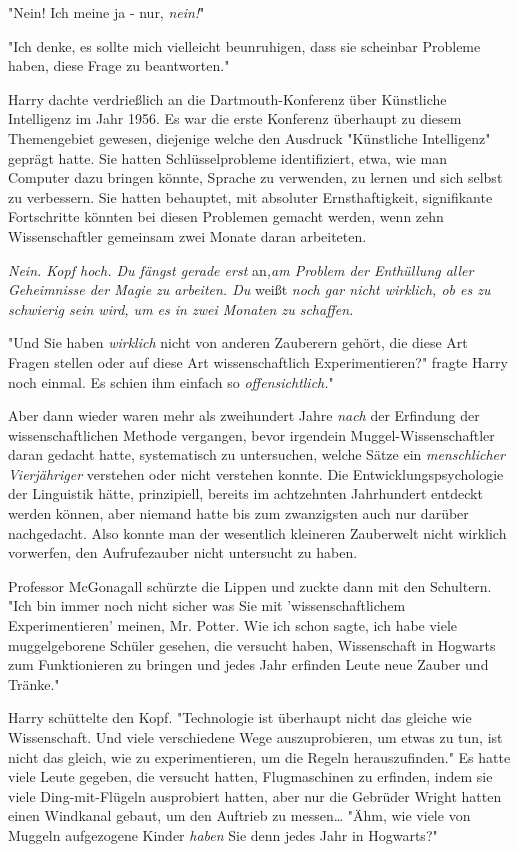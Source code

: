 {"Nein! Ich meine ja - nur, \emph{nein!}"

"Ich denke, es sollte mich vielleicht beunruhigen, dass sie scheinbar Probleme haben, diese Frage zu beantworten."

Harry dachte verdrießlich an die Dartmouth-Konferenz über Künstliche Intelligenz im Jahr 1956. Es war die erste Konferenz überhaupt zu diesem Themengebiet gewesen, diejenige welche den Ausdruck "Künstliche Intelligenz" geprägt hatte. Sie hatten Schlüsselprobleme identifiziert, etwa, wie man Computer dazu bringen könnte, Sprache zu verwenden, zu lernen und sich selbst zu verbessern. Sie hatten behauptet, mit absoluter Ernsthaftigkeit, signifikante Fortschritte könnten bei diesen Problemen gemacht werden, wenn zehn Wissenschaftler gemeinsam zwei Monate daran arbeiteten.

\emph{Nein. Kopf hoch. Du fängst gerade erst} an\emph{,am Problem der Enthüllung aller Geheimnisse der Magie zu arbeiten. Du} weißt \emph{noch gar nicht wirklich, ob es zu schwierig sein wird, um es in zwei Monaten zu schaffen.}

"Und Sie haben \emph{wirklich} nicht von anderen Zauberern gehört, die diese Art Fragen stellen oder auf diese Art wissenschaftlich Experimentieren?" fragte Harry noch einmal. Es schien ihm einfach so \emph{offensichtlich.}"

Aber dann wieder waren mehr als zweihundert Jahre \emph{nach} der Erfindung der wissenschaftlichen Methode vergangen, bevor irgendein Muggel-Wissenschaftler daran gedacht hatte, systematisch zu untersuchen, welche Sätze ein \emph{menschlicher Vierjähriger} verstehen oder nicht verstehen konnte. Die Entwicklungspsychologie der Linguistik hätte, prinzipiell, bereits im achtzehnten Jahrhundert entdeckt werden können, aber niemand hatte bis zum zwanzigsten auch nur darüber nachgedacht. Also konnte man der wesentlich kleineren Zauberwelt nicht wirklich vorwerfen, den Aufrufezauber nicht untersucht zu haben.

Professor McGonagall schürzte die Lippen und zuckte dann mit den Schultern. "Ich bin immer noch nicht sicher was Sie mit 'wissenschaftlichem Experimentieren' meinen, Mr. Potter. Wie ich schon sagte, ich habe viele muggelgeborene Schüler gesehen, die versucht haben, Wissenschaft in Hogwarts zum Funktionieren zu bringen und jedes Jahr erfinden Leute neue Zauber und Tränke."

Harry schüttelte den Kopf. "Technologie ist überhaupt nicht das gleiche wie Wissenschaft. Und viele verschiedene Wege auszuprobieren, um etwas zu tun, ist nicht das gleich, wie zu experimentieren, um die Regeln herauszufinden." Es hatte viele Leute gegeben, die versucht hatten, Flugmaschinen zu erfinden, indem sie viele Ding-mit-Flügeln ausprobiert hatten, aber nur die Gebrüder Wright hatten einen Windkanal gebaut, um den Auftrieb zu messen… "Ähm, wie viele von Muggeln aufgezogene Kinder \emph{haben} Sie denn jedes Jahr in Hogwarts?"

}
